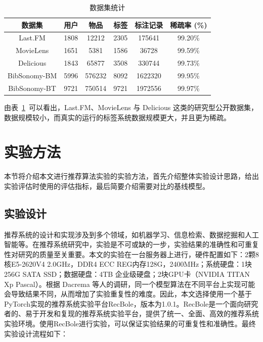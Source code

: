 \begin{table}[h]
    \begin{center}
    \caption{数据集统计}
      \begin{tabular}{cccccc}
      \hline
      \textbf{数据集} & \textbf{用户} & \textbf{物品} & \textbf{标签} & \textbf{标注记录} & \textbf{稀疏率} (\%) \\
      \hline
      Last.FM & 1808 & 12212 & 2305 & 175641 & 99.20\% \\
      MovieLens & 1651 & 5381 & 1586 & 36728 & 99.59\% \\
      Delicious & 1843 & 65877 & 3508 & 330744 & 99.73\% \\
      BibSonomy-BM & 5996 & 576232 & 8092 & 1622320 & 99.95\% \\
      BibSonomy-BT & 9721 & 750514 & 9721 & 1972556 & 99.97\% \\
      \hline
      \end{tabular}
    \label{data_sta}
  \end{center}
  \end{table}

由表~\ref{data_sta}~可以看出，Last.FM、MovieLens 与 Delicious 这类的研究型公开数据集，数据规模较小，而真实的运行的标签系统数据规模更大，并且更为稀疏。



\section{实验方法}
本节将介绍本文进行推荐算法实验的实验方法，首先介绍整体实验设计思路，给出实验评估时使用的评估指标，最后简要介绍需要对比的基线模型。
\subsection{实验设计}
推荐系统的设计和实现涉及到多个领域，如机器学习、信息检索、数据挖掘和人工智能等。在推荐系统研究中，实验是不可或缺的一步，实验结果的准确性和可重复性对研究的质量至关重要。本文的实验在一台服务器上进行，硬件配置如下：2颗8核E5-2620V4 2.0GHz，DDR4 ECC REG内存128G，2400MHz；系统硬盘：1块256G SATA SSD；数据硬盘：4TB 企业级硬盘；2块GPU卡（NVIDIA TITAN Xp Pascal）。根据 Dacrema 等人\cite{dacrema_arewe_2019}的调研，同一个模型算法在不同平台上实现可能会导致结果不同，从而增加了实验重复性的难度。因此，本文选择使用一个基于PyTorch实现的推荐系统实验平台RecBole\cite{zhao_recbole_2021}，版本为1.0.1。RecBole是一个面向研究者的、易于开发和复现的推荐系统实验平台，提供了统一、全面、高效的推荐系统实验环境。使用RecBole进行实验，可以保证实验结果的可重复性和准确性。最终实验设计流程如下：

